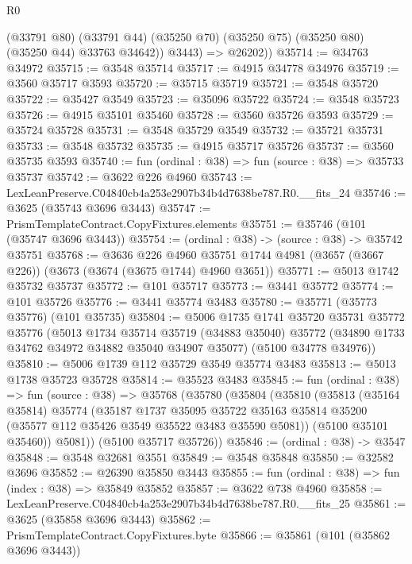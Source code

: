 \begin{lexlean}{R0}
\begin{coremodule}
            (@33791 @80)
            (@33791 @44)
            (@35250 @70)
            (@35250 @75)
            (@35250 @80)
            (@35250 @44)
            @33763
            @34642))
        @3443) =>
      @26202))
@35714 := @34763 @34972
@35715 := @3548 @35714
@35717 := @4915 @34778 @34976
@35719 := @3560 @35717 @3593
@35720 := @35715 @35719
@35721 := @3548 @35720
@35722 := @35427 @3549
@35723 := @35096 @35722
@35724 := @3548 @35723
@35726 := @4915 @35101 @35460
@35728 := @3560 @35726 @3593
@35729 := @35724 @35728
@35731 := @3548 @35729 @3549
@35732 := @35721 @35731
@35733 := @3548 @35732
@35735 := @4915 @35717 @35726
@35737 := @3560 @35735 @3593
@35740 := fun (ordinal : @38) => fun (source : @38) => @35733 @35737
@35742 := @3622 @226 @4960
@35743 := LexLeanPreserve.C04840cb4a253e2907b34b4d7638be787.R0.__fits_24
@35746 := @3625 (@35743 @3696 @3443)
@35747 := PrismTemplateContract.CopyFixtures.elements
@35751 := @35746 (@101 (@35747 @3696 @3443))
@35754 := (ordinal : @38) -> (source : @38) -> @35742 @35751
@35768 := @3636
    @226
    @4960
    @35751
    @1744
    @4981
    (@3657 (@3667 @226))
    (@3673 (@3674 (@3675 @1744) @4960 @3651))
@35771 := @5013 @1742 @35732 @35737
@35772 := @101 @35717
@35773 := @3441 @35772
@35774 := @101 @35726
@35776 := @3441 @35774 @3483
@35780 := @35771 (@35773 @35776) (@101 @35735)
@35804 := @5006
    @1735
    @1741
    @35720
    @35731
    @35772
    @35776
    (@5013
      @1734
      @35714
      @35719
      (@34883 @35040)
      @35772
      (@34890 @1733 @34762 @34972 @34882 @35040 @34907 @35077)
      (@5100 @34778 @34976))
@35810 := @5006 @1739 @112 @35729 @3549 @35774 @3483
@35813 := @5013 @1738 @35723 @35728
@35814 := @35523 @3483
@35845 := fun (ordinal : @38) =>
  fun (source : @38) =>
  @35768
    (@35780
      (@35804
        (@35810
          (@35813
            (@35164 @35814)
            @35774
            (@35187
              @1737
              @35095
              @35722
              @35163
              @35814
              @35200
              (@35577 @112 @35426 @3549 @35522 @3483 @35590 @5081))
            (@5100 @35101 @35460))
          @5081))
      (@5100 @35717 @35726))
@35846 := (ordinal : @38) -> @3547
@35848 := @3548 @32681 @3551
@35849 := @3548 @35848
@35850 := @32582 @3696
@35852 := @26390 @35850 @3443
@35855 := fun (ordinal : @38) => fun (index : @38) => @35849 @35852
@35857 := @3622 @738 @4960
@35858 := LexLeanPreserve.C04840cb4a253e2907b34b4d7638be787.R0.__fits_25
@35861 := @3625 (@35858 @3696 @3443)
@35862 := PrismTemplateContract.CopyFixtures.byte
@35866 := @35861 (@101 (@35862 @3696 @3443))

\end{coremodule}
\end{lexlean}
